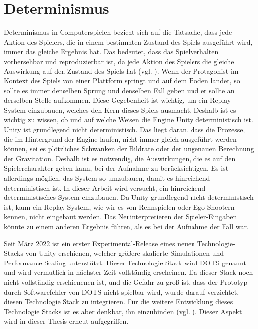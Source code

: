 \section{Determinismus}
Determinismus in Computerspielen bezieht sich auf die Tatsache, dass jede Aktion des Spielers, die in einem bestimmten Zustand des Spiels ausgeführt wird, immer das gleiche Ergebnis hat. Das bedeutet, dass das Spielverhalten vorhersehbar und reproduzierbar ist, da jede Aktion des Spielers die gleiche Auswirkung auf den Zustand des Spiels hat (vgl. \cite{noauthor_game_nodate}). Wenn der Protagonist im Kontext des Spiels von einer Plattform springt und auf dem Boden landet, so sollte es immer denselben Sprung und denselben Fall geben und er sollte an derselben Stelle aufkommen.
Diese Gegebenheit ist wichtig, um ein Replay-System einzubauen, welches den Kern dieses Spiels ausmacht. Deshalb ist es wichtig zu wissen, ob und auf welche Weisen die Engine Unity deterministisch ist. 
Unity ist grundlegend nicht deterministisch. Das liegt daran, dass die Prozesse, die im Hintergrund der Engine laufen, nicht immer gleich ausgeführt werden können, sei es plötzliches Schwanken der Bildrate oder der ungenauen Berechnung der Gravitation. Deshalb ist es notwendig, die Auswirkungen, die es auf den Spielercharakter geben kann, bei der Aufnahme zu berücksichtigen. Es ist allerdings möglich, das System so umzubauen, damit es hinreichend deterministisch ist. In dieser Arbeit wird versucht, ein hinreichend deterministisches System einzubauen.
Da Unity grundlegend nicht deterministisch ist, kann ein Replay-System, wie wir es von Rennspielen oder Ego-Shootern kennen, nicht eingebaut werden. Das Neuinterpretieren der Spieler-Eingaben könnte zu einem anderen Ergebnis führen, als es bei der Aufnahme der Fall war.

Seit März 2022 ist ein erster Experimental-Release eines neuen Technologie-Stacks von Unity erschienen, welcher größere skalierte Simulationen und Performance Scaling unterstützt. Dieser Technologie Stack wird \ac{DOTS} genannt und wird vermutlich in nächster Zeit vollständig erscheinen. Da dieser Stack noch nicht vollständig erschienenen ist, und die Gefahr zu groß ist, dass der Prototyp durch Softwarefehler von \ac{DOTS} nicht spielbar wird, wurde darauf verzichtet, diesen Technologie Stack zu integrieren. Für die weitere Entwicklung dieses Technologie Stacks ist es aber denkbar, ihn einzubinden  (vgl. \cite{technologies_dots_nodate}). Dieser Aspekt wird in  dieser Thesis erneut aufgegriffen.
